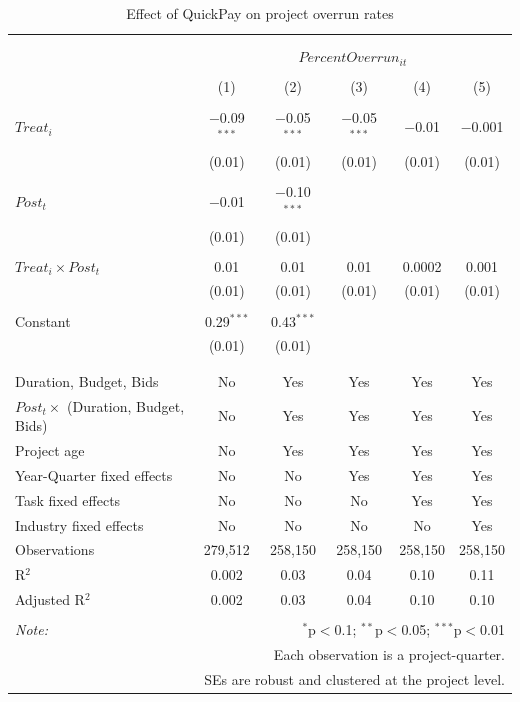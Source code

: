 \documentclass[
]{article}
\begin{document}
\begin{table}[H] \centering 
  \caption{Effect of QuickPay on project overrun rates} 
  \label{} 
\small 
\begin{tabular}{@{\extracolsep{-2pt}}lccccc} 
\\[-1.8ex]\hline 
\hline \\[-1.8ex] 
\\[-1.8ex] & \multicolumn{5}{c}{$PercentOverrun_{it}$} \\ 
\\[-1.8ex] & (1) & (2) & (3) & (4) & (5)\\ 
\hline \\[-1.8ex] 
 $Treat_i$ & $-$0.09$^{***}$ & $-$0.05$^{***}$ & $-$0.05$^{***}$ & $-$0.01 & $-$0.001 \\ 
  & (0.01) & (0.01) & (0.01) & (0.01) & (0.01) \\ 
  & & & & & \\ 
 $Post_t$ & $-$0.01 & $-$0.10$^{***}$ &  &  &  \\ 
  & (0.01) & (0.01) &  &  &  \\ 
  & & & & & \\ 
 $Treat_i \times Post_t$ & 0.01 & 0.01 & 0.01 & 0.0002 & 0.001 \\ 
  & (0.01) & (0.01) & (0.01) & (0.01) & (0.01) \\ 
  & & & & & \\ 
 Constant & 0.29$^{***}$ & 0.43$^{***}$ &  &  &  \\ 
  & (0.01) & (0.01) &  &  &  \\ 
  & & & & & \\ 
\hline \\[-1.8ex] 
Duration, Budget, Bids & No & Yes & Yes & Yes & Yes \\ 
$Post_t \times$  (Duration, Budget, Bids) & No & Yes & Yes & Yes & Yes \\ 
Project age & No & Yes & Yes & Yes & Yes \\ 
Year-Quarter fixed effects & No & No & Yes & Yes & Yes \\ 
Task fixed effects & No & No & No & Yes & Yes \\ 
Industry fixed effects & No & No & No & No & Yes \\ 
Observations & 279,512 & 258,150 & 258,150 & 258,150 & 258,150 \\ 
R$^{2}$ & 0.002 & 0.03 & 0.04 & 0.10 & 0.11 \\ 
Adjusted R$^{2}$ & 0.002 & 0.03 & 0.04 & 0.10 & 0.10 \\ 
\hline 
\hline \\[-1.8ex] 
\textit{Note:}  & \multicolumn{5}{r}{$^{*}$p$<$0.1; $^{**}$p$<$0.05; $^{***}$p$<$0.01} \\ 
 & \multicolumn{5}{r}{Each observation is a project-quarter.} \\ 
 & \multicolumn{5}{r}{SEs are robust and clustered at the project level.} \\ 
\end{tabular} 
\end{table}
\end{document}
